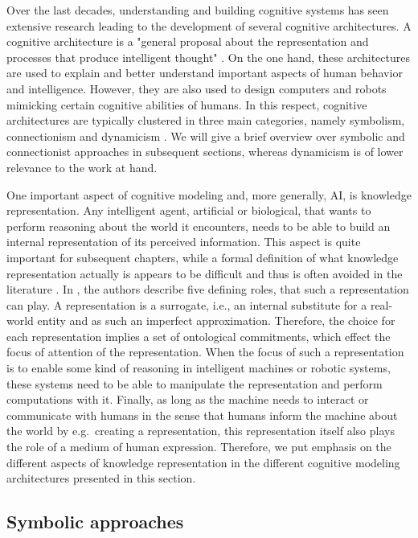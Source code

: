 Over the last decades, understanding and building cognitive systems has seen extensive research leading to the development of several cognitive architectures.
A cognitive architecture is a "general proposal about the representation and processes that produce intelligent thought" \cite{Thagard2012}.
On the one hand, these architectures are used to explain and better understand important aspects of human behavior and intelligence.
However, they are also used to design computers and robots mimicking certain cognitive abilities of humans.
In this respect, cognitive architectures are typically clustered in three main categories, namely symbolism, connectionism and dynamicism \cite{Eliasmith2013}.
We will give a brief overview over symbolic and connectionist approaches in subsequent sections, whereas dynamicism \cite{Schoener2008} is of lower relevance to the work at hand.

One important aspect of cognitive modeling and, more generally, \ac{AI}, is knowledge representation.
Any intelligent agent, artificial or biological, that wants to perform reasoning about the world it encounters, needs to be able to build an internal representation of its perceived information.
This aspect is quite important for subsequent chapters, while a formal definition of what knowledge representation actually is appears to be difficult and thus is often avoided in the literature \cite{Davis1993}.
In \cite{Davis1993}, the authors describe five defining roles, that such a representation can play.
A representation is a surrogate, i.e., an internal substitute for a real-world entity and as such an imperfect approximation.
Therefore, the choice for each representation implies a set of ontological commitments, which effect the focus of attention of the representation.  
When the focus of such a representation is to enable some kind of reasoning in intelligent machines or robotic systems, these systems need to be able to manipulate the representation and perform computations with it.
Finally, as long as the machine needs to interact or communicate with humans in the sense that humans inform the machine about the world by e.g.\ creating a representation, this representation itself also plays the role of a medium of human expression.
Therefore, we put emphasis on the different aspects of knowledge representation in the different cognitive modeling architectures presented in this section.

\subsection{Symbolic approaches}%
\label{subsec:symbolic_approaches}

